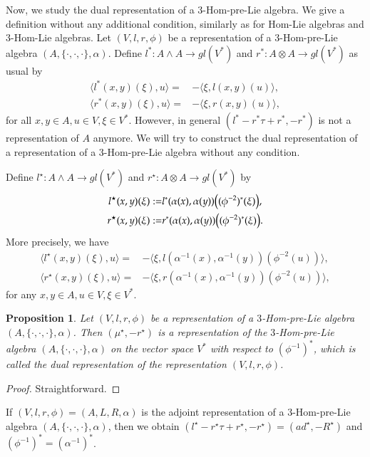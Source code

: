 \documentclass[a4paper,11pt]{article}
\def\a{\alpha}
\newtheorem{pro}[thm]{Proposition}
\theoremstyle{definition}
\begin{document}
Now, we study the dual representation of a $3$-Hom-pre-Lie algebra. We give a definition
without any additional condition, similarly as for Hom-Lie algebras and $3$-Hom-Lie algebras.
Let $(V,l,r,\phi)$ be a representation of a $3$-Hom-pre-Lie algebra  $(A,\{\cdot,\cdot,\cdot\},\a)$.
 Define $l^*: A\wedge A \longrightarrow gl(V^*)$  and $r^*: A \otimes A \longrightarrow gl(V^*)$ as usual by
 \begin{align*}
\langle l^*(x,y)(\xi),u\rangle=&-\langle\xi,l(x,y)(u)\rangle,\\
\langle r^*(x,y)(\xi),u\rangle=&-\langle\xi,r(x,y)(u)\rangle,
\end{align*}
for all $x,y \in A,u\in V,\xi\in V^*$.
However, in general $(l^*-r^*\tau+r^*,-r^*)$ is not a representation of $A$ anymore.  We  will try to construct the dual representation of a representation of a 3-Hom-pre-Lie algebra without any condition.

Define $l^\star:A \wedge A \longrightarrow gl(V^*)$ and $r^\star :A \otimes A \longrightarrow gl(V^*)$ by
\begin{align}\label{l,r star 1}
 l^\star(x,y)(\xi):=&l^*(\a(x),\a(y))\big{(}(\phi^{-2})^*(\xi)\big{)}, \\
  r^\star(x,y)(\xi):=&r^*(\a(x),\a(y))\big{(}(\phi^{-2})^*(\xi)\big{)}.
\end{align}
More precisely,  we have
\begin{align}\label{l,r star 2}
\langle l^\star(x,y)(\xi),u\rangle=&-\langle\xi,l(\a^{-1}(x),\a^{-1}(y))(\phi^{-2}(u))\rangle, \\
\langle r^\star(x,y)(\xi),u\rangle=&-\langle\xi,r(\a^{-1}(x),\a^{-1}(y))(\phi^{-2}(u))\rangle,
\end{align}
for any $x,y \in A, u\in V, \xi \in V^*$.


\begin{pro}
Let $(V,l,r,\phi)$ be a representation  of a $3$-Hom-pre-Lie algebra $(A,\{\cdot,\cdot,\cdot\},\a)$.  Then $(\mu^\star,-r^\star)$ is a representation of the  $3$-Hom-pre-Lie algebra $(A,\{\cdot,\cdot,\cdot\},\a)$  on the vector space $V^*$ with respect to $(\phi^{-1})^*$, which is called the dual representation of the representation $(V,l,r,\phi)$.
\end{pro}

\begin{proof}
Straightforward.
\end{proof}

 If $(V,l,r,\phi)=(A,L,R,\a)$ is the adjoint representation of a $3$-Hom-pre-Lie algebra $(A,\{\cdot,\cdot,\cdot\},\a)$, then we obtain
$(l^\star-r^\star\tau+r^\star,-r^\star)=(ad^\star,-R^\star)$ and $(\phi^{-1})^*=(\a^{-1})^*$.
\end{document}
